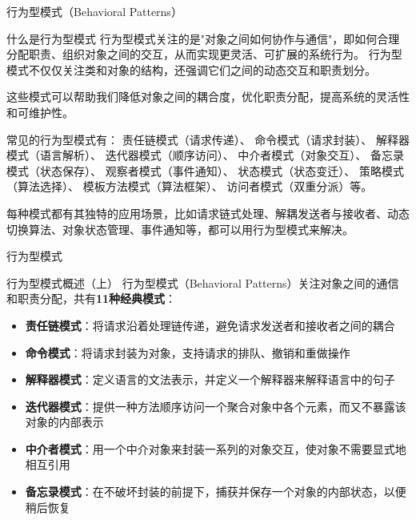\documentclass[UTF8,aspectratio=169]{beamer}
\begin{document}
\begin{frame}{行为型模式（Behavioral Patterns）}
    \begin{ytublock}{什么是行为型模式}
        行为型模式关注的是"对象之间如何协作与通信"，即如何合理分配职责、组织对象之间的交互，从而实现更灵活、可扩展的系统行为。
        行为型模式不仅仅关注类和对象的结构，还强调它们之间的动态交互和职责划分。

        这些模式可以帮助我们降低对象之间的耦合度，优化职责分配，提高系统的灵活性和可维护性。

        常见的行为型模式有：
        责任链模式（请求传递）、
        命令模式（请求封装）、
        解释器模式（语言解析）、
        迭代器模式（顺序访问）、
        中介者模式（对象交互）、
        备忘录模式（状态保存）、
        观察者模式（事件通知）、
        状态模式（状态变迁）、
        策略模式（算法选择）、
        模板方法模式（算法框架）、
        访问者模式（双重分派）等。

        每种模式都有其独特的应用场景，比如请求链式处理、解耦发送者与接收者、动态切换算法、对象状态管理、事件通知等，都可以用行为型模式来解决。
    \end{ytublock}
\end{frame}

\begin{frame}{行为型模式}
    \begin{ytublock}{行为型模式概述（上）}
        行为型模式（Behavioral Patterns）关注对象之间的通信和职责分配，共有\textbf{11种经典模式}：
        \begin{itemize}
            \item \textbf{责任链模式}：将请求沿着处理链传递，避免请求发送者和接收者之间的耦合
            \item \textbf{命令模式}：将请求封装为对象，支持请求的排队、撤销和重做操作
            \item \textbf{解释器模式}：定义语言的文法表示，并定义一个解释器来解释语言中的句子
            \item \textbf{迭代器模式}：提供一种方法顺序访问一个聚合对象中各个元素，而又不暴露该对象的内部表示
            \item \textbf{中介者模式}：用一个中介对象来封装一系列的对象交互，使对象不需要显式地相互引用
            \item \textbf{备忘录模式}：在不破坏封装的前提下，捕获并保存一个对象的内部状态，以便稍后恢复
        \end{itemize}
    \end{ytublock}
\end{frame}
\end{document}
